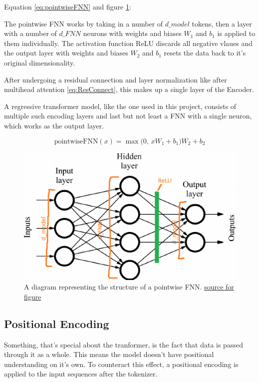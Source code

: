 \documentclass{article}
\begin{document}
Equation \eqref{eq:pointwiseFNN} and figure \ref{fig:pointwiseFNN}:

The pointwise FNN works by taking in a number of $d\_model$ tokens, then a 
layer with a number of $d\_FNN$ neurons with weights and biases $W_1$ and $b_1$ 
is applied to them individually. The activation function ReLU discards all 
negative vlaues and the output layer with weights and biases $W_2$ and $b_1$ 
resets the data back to it's original dimensionality.

After undergoing a residual connection and layer normalization like after 
multihead attention \eqref{eq:ResConnect}, this makes up a single layer of the 
Encoder.

A regressive transformer model, like the one used in this project, consists of 
multiple such encoding layers and last but not least a FNN with a single neuron, 
which works as the output layer.

\begin{equation}
    \text{pointwiseFNN}(x) = \max\bigl(0, \, x W_1 + b_1 \bigr) W_2 + b_2 \label{eq:pointwiseFNN}
\end{equation}

\begin{figure}[htbp]
    \centering
    \includegraphics[width=0.4\paperwidth]{images/pointwiseFNN.png}
    \caption{A diagram representing the structure of a pointwise FNN. \href{https://datascience.stackexchange.com/questions/68020/what-is-the-feedforward-network-in-a-transformer-trained-on}
    {source for figure}}
    \label{fig:pointwiseFNN}
\end{figure}

\subsection{Positional Encoding}

Something, that's special about the tranformer, is the fact that data is passed 
through it as a whole. This means the model doesn't have positional understanding 
on it's own. To counteract this effect, a positional encoding is applied to the 
input sequences after the tokenizer.


\newpage
\printbibliography[heading=bibintoc]
\end{document}
